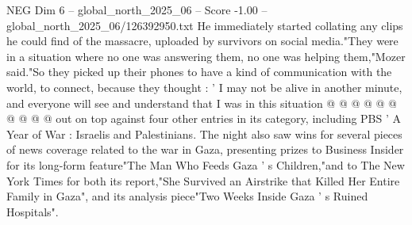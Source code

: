 \begin{textsample}{NEG Dim 6 – global\_north\_2025\_06 – Score -1.00 – global\_north\_2025\_06/126392950.txt}
He immediately started collating any clips he could find of the massacre, uploaded by survivors on social media."They were in a situation where no one was answering them, no one was helping them,"Mozer said."So they picked up their phones to have a kind of communication with the world, to connect, because they thought : ' I may not be alive in another minute, and everyone will see and understand that I was in this situation @ @ @ @ @ @ @ @ @ @ out on top against four other entries in its category, including PBS ' A Year of War : Israelis and Palestinians.
The night also saw wins for several pieces of news coverage related to the war in Gaza, presenting prizes to Business Insider for its long-form feature"The Man Who Feeds Gaza ' s Children,"and to The New York Times for both its report,"She Survived an Airstrike that Killed Her Entire Family in Gaza", and its analysis piece"Two Weeks Inside Gaza ' s Ruined Hospitals".

\end{textsample}

